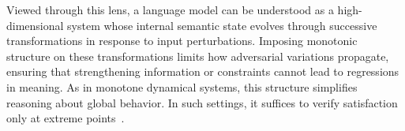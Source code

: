 \documentclass{article}
\theoremstyle{plain}
\theoremstyle{definition}
\theoremstyle{remark}
\begin{document}
Viewed through this lens, a language model can be understood as a high-dimensional system whose internal semantic state evolves through successive transformations in response to input perturbations. Imposing monotonic structure on these transformations limits how adversarial variations propagate, ensuring that strengthening information or constraints cannot lead to regressions in meaning. As in monotone dynamical systems, this structure simplifies reasoning about global behavior. In such settings, it suffices to verify satisfaction only at extreme points~\cite{feyzmahdavian2017stability}.




\end{document}
